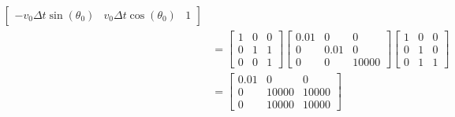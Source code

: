 \documentclass[answers]{exam}
\begin{document}
\begin{questions}
\begin{parts}
\begin{solution}
\begin{align*}
\begin{bmatrix}
                                                                     -v_0 \Delta t \sin(\theta_0) & v_0 \Delta t \cos(\theta_0) & 1
                                                                 \end{bmatrix} \\
                                 & = \begin{bmatrix}
                                         1 & 0 & 0 \\
                                         0 & 1 & 1 \\
                                         0 & 0 & 1
                                     \end{bmatrix} \begin{bmatrix}
                                                       0.01 & 0    & 0     \\
                                                       0    & 0.01 & 0     \\
                                                       0    & 0    & 10000
                                                   \end{bmatrix} \begin{bmatrix}
                                                                     1 & 0 & 0 \\
                                                                     0 & 1 & 0 \\
                                                                     0 & 1 & 1
                                                                 \end{bmatrix}                                                 \\
                                 & = \begin{bmatrix}
                                         0.01 & 0     & 0     \\
                                         0    & 10000 & 10000 \\
                                         0    & 10000 & 10000
                                     \end{bmatrix}
            \end{align*}


\end{solution}
\end{parts}
\end{questions}
\end{document}
